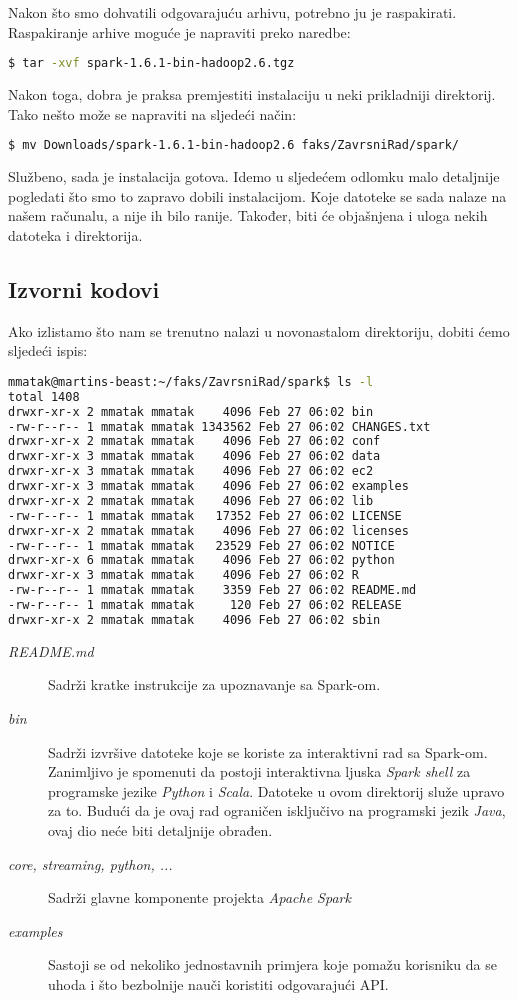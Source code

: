 \documentclass[times, utf8, zavrsni]{fer}
\begin{document}
Nakon što smo dohvatili odgovarajuću arhivu, potrebno ju je raspakirati.\\ Raspakiranje arhive moguće je napraviti preko naredbe:
\begin{lstlisting}[language=bash]
$ tar -xvf spark-1.6.1-bin-hadoop2.6.tgz
\end{lstlisting}
Nakon toga, dobra je praksa premjestiti instalaciju u neki prikladniji direktorij. Tako nešto može se napraviti na sljedeći način:
\begin{lstlisting}[language=bash]
$ mv Downloads/spark-1.6.1-bin-hadoop2.6 faks/ZavrsniRad/spark/
\end{lstlisting}
Službeno, sada je instalacija gotova. Idemo u sljedećem odlomku malo detaljnije pogledati što smo to zapravo dobili instalacijom. Koje datoteke se sada nalaze na našem računalu, a nije ih bilo ranije. Također, biti će objašnjena i uloga nekih datoteka i direktorija.

\subsection{Izvorni kodovi}
Ako izlistamo što nam se trenutno nalazi u novonastalom direktoriju, dobiti ćemo sljedeći ispis:
\begin{lstlisting}[language=bash]
mmatak@martins-beast:~/faks/ZavrsniRad/spark$ ls -l
total 1408
drwxr-xr-x 2 mmatak mmatak    4096 Feb 27 06:02 bin
-rw-r--r-- 1 mmatak mmatak 1343562 Feb 27 06:02 CHANGES.txt
drwxr-xr-x 2 mmatak mmatak    4096 Feb 27 06:02 conf
drwxr-xr-x 3 mmatak mmatak    4096 Feb 27 06:02 data
drwxr-xr-x 3 mmatak mmatak    4096 Feb 27 06:02 ec2
drwxr-xr-x 3 mmatak mmatak    4096 Feb 27 06:02 examples
drwxr-xr-x 2 mmatak mmatak    4096 Feb 27 06:02 lib
-rw-r--r-- 1 mmatak mmatak   17352 Feb 27 06:02 LICENSE
drwxr-xr-x 2 mmatak mmatak    4096 Feb 27 06:02 licenses
-rw-r--r-- 1 mmatak mmatak   23529 Feb 27 06:02 NOTICE
drwxr-xr-x 6 mmatak mmatak    4096 Feb 27 06:02 python
drwxr-xr-x 3 mmatak mmatak    4096 Feb 27 06:02 R
-rw-r--r-- 1 mmatak mmatak    3359 Feb 27 06:02 README.md
-rw-r--r-- 1 mmatak mmatak     120 Feb 27 06:02 RELEASE
drwxr-xr-x 2 mmatak mmatak    4096 Feb 27 06:02 sbin
\end{lstlisting}

\begin{description}
\item[\emph{README.md} ]Sadrži kratke instrukcije za upoznavanje sa Spark-om.
\item[\emph{bin} ]Sadrži izvršive datoteke koje se koriste za interaktivni rad sa Spark-om.\\Zanimljivo je spomenuti da postoji interaktivna ljuska \emph{Spark shell} za programske jezike \emph{Python} i \emph{Scala}. Datoteke u ovom direktorij služe upravo za to. Budući da je ovaj rad ograničen isključivo na programski jezik \emph{Java}, ovaj dio neće biti detaljnije obrađen.
\item[\emph{core, streaming, python, ...} ]Sadrži glavne komponente projekta \emph{Apache Spark} 
\item[\emph{examples} ]Sastoji se od nekoliko jednostavnih primjera koje pomažu korisniku da se uhoda i što bezbolnije nauči koristiti odgovarajući API.
\end{description}
\end{document}

